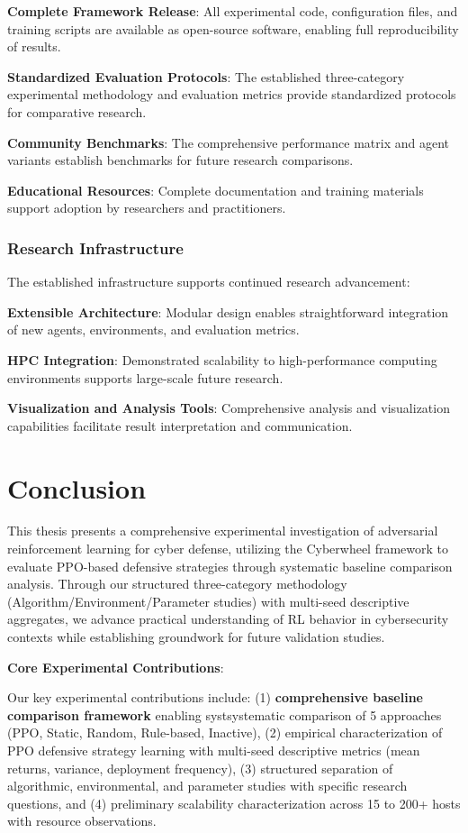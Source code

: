 \documentclass[12pt,oneside]{article}
\begin{document}
\textbf{Complete Framework Release}: All experimental code, configuration files, and training scripts are available as open-source software, enabling full reproducibility of results.

\textbf{Standardized Evaluation Protocols}: The established three-category experimental methodology and evaluation metrics provide standardized protocols for comparative research.

\textbf{Community Benchmarks}: The comprehensive performance matrix and agent variants establish benchmarks for future research comparisons.

\textbf{Educational Resources}: Complete documentation and training materials support adoption by researchers and practitioners.

\subsubsection{Research Infrastructure}
The established infrastructure supports continued research advancement:

\textbf{Extensible Architecture}: Modular design enables straightforward integration of new agents, environments, and evaluation metrics.

\textbf{HPC Integration}: Demonstrated scalability to high-performance computing environments supports large-scale future research.

\textbf{Visualization and Analysis Tools}: Comprehensive analysis and visualization capabilities facilitate result interpretation and communication.

\section{Conclusion}

This thesis presents a comprehensive experimental investigation of adversarial reinforcement learning for cyber defense, utilizing the Cyberwheel framework to evaluate PPO-based defensive strategies through systematic baseline comparison analysis. Through our structured three-category methodology (Algorithm/Environment/Parameter studies) with multi-seed descriptive aggregates, we advance practical understanding of RL behavior in cybersecurity contexts while establishing groundwork for future validation studies.

\textbf{Core Experimental Contributions}:

Our key experimental contributions include: (1) \textbf{comprehensive baseline comparison framework} enabling systsystematic comparison of 5 approaches (PPO, Static, Random, Rule-based, Inactive), (2) empirical characterization of PPO defensive strategy learning with multi-seed descriptive metrics (mean returns, variance, deployment frequency), (3) structured separation of algorithmic, environmental, and parameter studies with specific research questions, and (4) preliminary scalability characterization across 15 to 200+ hosts with resource observations.
\end{document}
